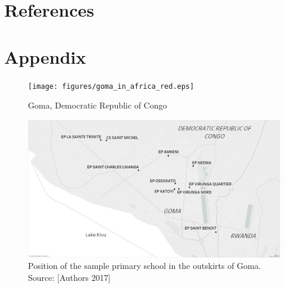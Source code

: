\documentclass[authoryear, preprint, review, 12pt]{elsarticle}
\renewcommand{\thetable}{\arabic{table}}
\begin{document}
\clearpage

\section*{References}
\footnotesize



\clearpage

\processdelayedfloats

\clearpage
\normalsize
\section*{Appendix}
\processdelayedfloats
\renewcommand{\thefigure}{A\arabic{figure}}
\renewcommand{\thepostfigure}{A\arabic{postfigure}}
\setcounter{figure}{0}
\setcounter{postfigure}{0}
\renewcommand{\thetable}{A\arabic{table}}
\renewcommand{\theposttable}{A\arabic{posttable}}
\setcounter{table}{0}
\setcounter{posttable}{0}

\begin{figure}[!h]
\centering
\texttt{[image: figures/goma\_in\_africa\_red.eps]}
\caption{Goma, Democratic Republic of Congo}
\end{figure}

\begin{figure}[!h]
\centering
\includegraphics[width=0.7\linewidth]{figures/goma_map_RISS_bn.JPG}
\caption{Position of the sample primary school in the outskirts of Goma. Source: [Authors 2017]}
\end{figure}
\end{document}

